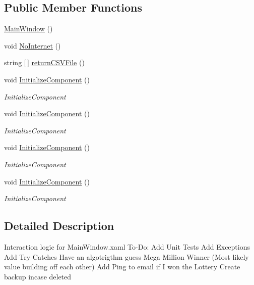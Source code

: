 \subsection*{Public Member Functions}
\begin{DoxyCompactItemize}
\item 
\hyperlink{class_mega_millions_app_1_1_main_window_a210c0d0a00df2f30fb420ca5d678e503}{Main\+Window} ()
\item 
void \hyperlink{class_mega_millions_app_1_1_main_window_af6204da9365bd08d3e308482e41670db}{No\+Internet} ()
\item 
string \mbox{[}$\,$\mbox{]} \hyperlink{class_mega_millions_app_1_1_main_window_a78484547e4d9c4fcdba16561fdcdedaf}{return\+C\+S\+V\+File} ()
\item 
void \hyperlink{class_mega_millions_app_1_1_main_window_ad2d6dbbec2573cc740c34b17c2017dcd}{Initialize\+Component} ()
\begin{DoxyCompactList}\small\item\em Initialize\+Component \end{DoxyCompactList}\item 
void \hyperlink{class_mega_millions_app_1_1_main_window_ad2d6dbbec2573cc740c34b17c2017dcd}{Initialize\+Component} ()
\begin{DoxyCompactList}\small\item\em Initialize\+Component \end{DoxyCompactList}\item 
void \hyperlink{class_mega_millions_app_1_1_main_window_ad2d6dbbec2573cc740c34b17c2017dcd}{Initialize\+Component} ()
\begin{DoxyCompactList}\small\item\em Initialize\+Component \end{DoxyCompactList}\item 
void \hyperlink{class_mega_millions_app_1_1_main_window_ad2d6dbbec2573cc740c34b17c2017dcd}{Initialize\+Component} ()
\begin{DoxyCompactList}\small\item\em Initialize\+Component \end{DoxyCompactList}\end{DoxyCompactItemize}


\subsection{Detailed Description}
Interaction logic for Main\+Window.\+xaml To-\/\+Do\+: Add Unit Tests Add Exceptions Add Try Catches Have an algotrigthm guess Mega Million Winner (Most likely value building off each other) Add Ping to email if I won the Lottery Create backup incase deleted 

